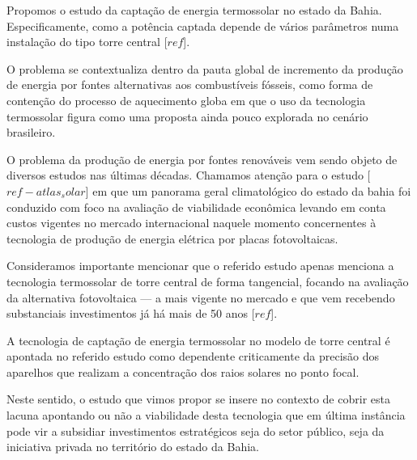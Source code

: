 



Propomos o estudo da captação de energia termossolar no estado da Bahia.
Especificamente, como a potência captada depende de vários parâmetros numa
instalação do tipo torre central [$ref$].

O problema se contextualiza dentro da pauta global de incremento da produção de
energia por fontes alternativas aos combustíveis fósseis, como forma de
contenção do processo de aquecimento globa em que o uso da tecnologia
termossolar figura como uma proposta ainda pouco explorada no cenário
brasileiro.

O problema da produção de energia por fontes renováveis vem sendo objeto de
diversos estudos nas últimas décadas. Chamamos atenção para o estudo
[$ref-atlas_solar$] em que um panorama geral climatológico do estado da bahia
foi conduzido com foco na avaliação de viabilidade econômica levando em conta
custos vigentes no mercado internacional naquele momento concernentes à tecnologia 
de produção de energia elétrica por placas fotovoltaicas.

Consideramos importante mencionar que o referido estudo apenas menciona a
tecnologia termossolar de torre central de forma tangencial, focando na
avaliação da alternativa fotovoltaica --- a mais vigente no mercado e que vem
recebendo substanciais investimentos já há mais de 50 anos [$ref$].

A tecnologia de captação de energia termossolar no modelo de torre central é
apontada no referido estudo como dependente criticamente da precisão dos
aparelhos que realizam a concentração dos raios solares no ponto focal.

Neste sentido, o estudo que vimos propor se insere no contexto de cobrir esta
lacuna apontando ou não a viabilidade desta tecnologia que em última instância
pode vir a subsidiar investimentos estratégicos seja do setor público, seja da
iniciativa privada no território do estado da Bahia.
